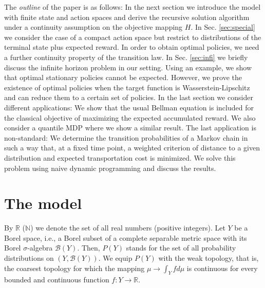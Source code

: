 \documentclass[reqno, 12pt]{amsart}%
\newcommand{\R}{\mathbb{R}} %
\newcommand{\N}{\mathbb{N}} %
\theoremstyle{definition}
\numberwithin{equation}{section} \numberwithin{theorem}{section}
\begin{document}
The {\em outline} of the paper is as follows: In the next section we introduce the model with finite  state and action spaces and derive the recursive solution algorithm under a continuity assumption on the objective mapping $H$. In Sec. \ref{sec:special} we consider the case of a compact action space but restrict to distributions of the terminal state plus expected reward. In order to obtain optimal policies, we need a further continuity property of the transition law. In Sec. \ref{sec:infi} we briefly discuss the infinite horizon problem in our setting. Using an example, we show that optimal stationary policies cannot be expected. However, we prove the existence of optimal policies when the target function is Wasserstein-Lipschitz and can reduce them to a certain set of policies. In the last section we consider different applications: We show that the usual Bellman equation is included for the classical objective of maximizing the expected accumulated reward. We also consider a quantile MDP where we show a similar result. The last application is non-standard: We  determine the transition probabilities of a Markov chain in such a way that, at a fixed time point, a weighted criterion of distance to a  given distribution and expected transportation cost is minimized. We solve this problem using naive dynamic programming and discuss the results.

\section{The model}\label{sec:model}

By $\R$ ($\N$) we denote the set of all real 
numbers (positive integers). Let $Y$ be a Borel space, i.e., a Borel subset of a complete separable metric space with its Borel $\sigma$-algebra 
$\mathcal{B}(Y).$ Then, $P(Y)$  stands for  the set of all probability distributions on  
$(Y,\mathcal{B}(Y)).$ We equip $P(Y)$ with the weak topology, that is, the coarsest topology for which the mapping $\mu\to\int_Y fd\mu$ is continuous for every bounded and continuous function $f: Y\to\R.$
\end{document}
